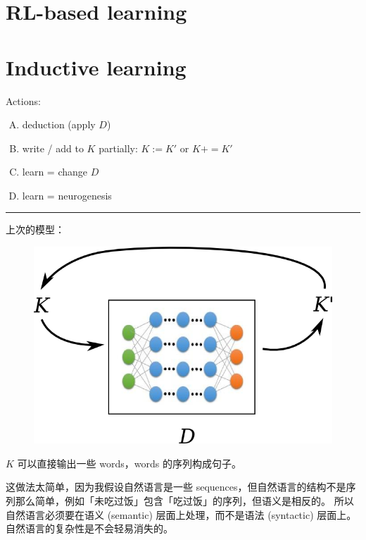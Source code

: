 \documentclass[12pt]{article}
\begin{document}
\begin{center}
\end{center}

\section{RL-based learning}



\section{Inductive learning}

Actions:
\begin{enumerate}[(A)]
\item deduction (apply $D$)
\item write / add to $K$ partially:  $K := K'$ or $K += K'$
\item learn = change $D$
\item learn = neurogenesis
\end{enumerate}


{\color{red}\rule{10cm}{2pt}}

上次的模型：
\begin{figure}[H]
\centering
\includegraphics[scale=0.75]{reasoner-model.png}
\end{figure}
$K$ 可以直接输出一些 words，words 的序列构成句子。

这做法太简单，因为我假设自然语言是一些 sequences，但自然语言的结构不是序列那么简单，例如「未吃过饭」包含「吃过饭」的序列，但语义是相反的。 所以自然语言必须要在语义 (semantic) 层面上处理，而不是语法 (syntactic) 层面上。 自然语言的复杂性是不会轻易消失的。
\end{document}
